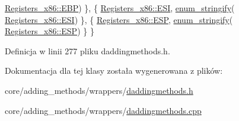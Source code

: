 \begin{DoxyCode}
      \hyperlink{codedefines_8h_a0f84efe4ca4d99203713a78bd6e8c82ea4e7627e030290994aff0ced165dbfc7b}{Registers\_x86::EBP}) \},
    \{ \hyperlink{codedefines_8h_a0f84efe4ca4d99203713a78bd6e8c82eadd445edb9c3b702b74855e30f795ad4e}{Registers\_x86::ESI}, \hyperlink{daddingmethods_8h_a9cdaa38dc2ea9f97e7169c4a05ab0ede}{enum\_stringify}(
      \hyperlink{codedefines_8h_a0f84efe4ca4d99203713a78bd6e8c82eadd445edb9c3b702b74855e30f795ad4e}{Registers\_x86::ESI}) \},
    \{ \hyperlink{codedefines_8h_a0f84efe4ca4d99203713a78bd6e8c82ea3e30ce90c5b1d89ae09b7d4c73d8e172}{Registers\_x86::ESP}, \hyperlink{daddingmethods_8h_a9cdaa38dc2ea9f97e7169c4a05ab0ede}{enum\_stringify}(
      \hyperlink{codedefines_8h_a0f84efe4ca4d99203713a78bd6e8c82ea3e30ce90c5b1d89ae09b7d4c73d8e172}{Registers\_x86::ESP}) \}
\}
\end{DoxyCode}


Definicja w linii 277 pliku daddingmethods.\-h.



Dokumentacja dla tej klasy została wygenerowana z plików\-:\begin{DoxyCompactItemize}
\item 
core/adding\-\_\-methods/wrappers/\hyperlink{daddingmethods_8h}{daddingmethods.\-h}\item 
core/adding\-\_\-methods/wrappers/\hyperlink{daddingmethods_8cpp}{daddingmethods.\-cpp}\end{DoxyCompactItemize}
